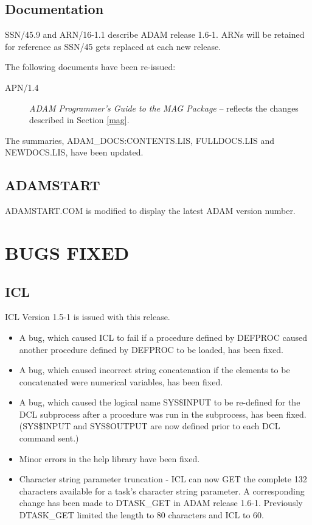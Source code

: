 \subsection{Documentation}
SSN/45.9 and ARN/16-1.1 describe ADAM release 1.6-1.
ARNs will be retained for reference as SSN/45 gets replaced at each new release.

The following documents have been re-issued:

\begin{description}
\item[APN/1.4] {\it ADAM Programmer's Guide to the MAG Package} -- reflects
the changes described in Section \ref{mag}.
\end{description}

The summaries, ADAM\_DOCS:CONTENTS.LIS, FULLDOCS.LIS and NEWDOCS.LIS, have been 
updated. 

\subsection{ADAMSTART}
ADAMSTART.COM is modified to display the latest ADAM version number.

\section{BUGS FIXED}
\subsection{ICL}
ICL Version 1.5-1 is issued with this release.
\begin{itemize}
\item A bug, which caused ICL to fail if a procedure defined by DEFPROC caused
another procedure defined by DEFPROC to be loaded, has been fixed.

\item A bug, which caused incorrect string concatenation if the elements to be
concatenated were numerical variables, has been fixed.

\item A bug, which caused the logical name SYS\$INPUT to be re-defined for the
DCL subprocess after a procedure was run in the subprocess, has been fixed.
(SYS\$INPUT and SYS\$OUTPUT are now defined prior to each DCL command sent.)

\item Minor errors in the help library have been fixed.

\item Character string parameter truncation -
ICL can now GET the complete 132 characters available
for a task's character string parameter. A corresponding change has been
made to DTASK\_GET in ADAM release 1.6-1.
Previously DTASK\_GET limited the length to 80 characters and ICL to 60.
\end{itemize}

